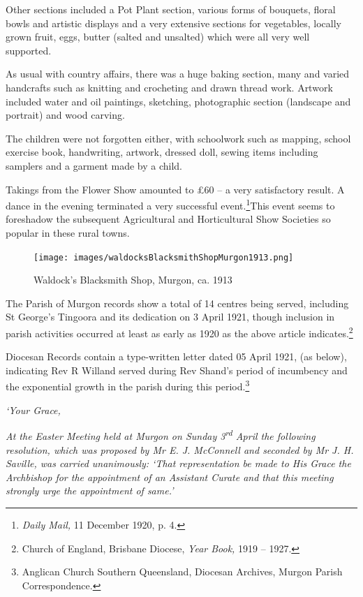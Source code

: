 Other sections included a Pot Plant section, various forms of bouquets,
floral bowls and artistic displays and a very extensive sections for
vegetables, locally grown fruit, eggs, butter (salted and unsalted)
which were all very well supported.

As usual with country affairs, there was a huge baking section, many and
varied handcrafts such as knitting and crocheting and drawn thread work.
Artwork included water and oil paintings, sketching, photographic
section (landscape and portrait) and wood carving.

The children were not forgotten either, with schoolwork such as mapping,
school exercise book, handwriting, artwork, dressed doll, sewing items
including samplers and a garment made by a child.

Takings from the Flower Show amounted to \pounds60 -- a very satisfactory
result. A dance in the evening terminated a very successful
event.\footnote{\emph{Daily Mail,} 11 December 1920, p. 4.}This event
seems to foreshadow the subsequent Agricultural and Horticultural Show
Societies so popular in these rural towns.




\begin{figure}
\begin{center}
\texttt{[image: images/waldocksBlacksmithShopMurgon1913.png]}
\caption{Waldock's Blacksmith Shop, Murgon, ca. 1913}
\end{center}
\end{figure}


The Parish of Murgon records show a total of 14 centres being served,
including St George's Tingoora and its dedication on 3 April 1921,
though inclusion in parish activities occurred at least as early as 1920
as the above article indicates.\footnote{Church of England, Brisbane
  Diocese, \emph{Year Book,} 1919 -- 1927.}

Diocesan Records contain a type-written letter dated 05 April 1921, (as
below), indicating Rev R Willand served during Rev Shand's period of
incumbency and the exponential growth in the parish during this
period.\footnote{Anglican Church Southern Queensland, Diocesan Archives,
  Murgon Parish Correspondence.}

\emph{`Your Grace,}

\emph{At the Easter Meeting held at Murgon on Sunday
3\textsuperscript{rd} April the following resolution, which was proposed
by Mr E. J. McConnell and seconded by Mr J. H. Saville, was carried
unanimously: `That representation be made to His Grace the Archbishop
for the appointment of an Assistant Curate and that this meeting
strongly urge the appointment of same.'}

